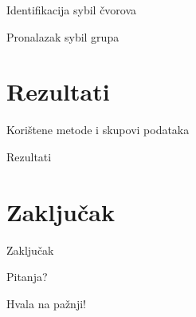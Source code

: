 \documentclass{beamer}
\begin{document}
\begin{frame}{Identifikacija sybil čvorova}
\end{frame}

\begin{frame}{Pronalazak sybil grupa}
\end{frame}

\section{Rezultati}

\begin{frame}{Korištene metode i skupovi podataka}
\end{frame}

\begin{frame}{Rezultati}
\end{frame}

\section{Zaključak}

\begin{frame}{Zaključak}
\end{frame}

\begin{frame}[standout]{Pitanja?}
\end{frame}

\begin{frame}[standout]{Hvala na pažnji!}
\end{frame}
\end{document}
